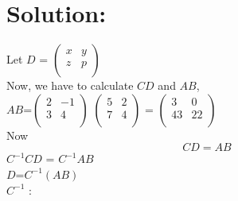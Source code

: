 \documentclass{article}
\begin{document}
\section*{Solution:}
Let $D$ = $\begin{pmatrix}
    x & y\\
    z & p\\
\end{pmatrix}$\\ 
Now, we have to calculate $CD$ and $AB$,\\
$AB$=$\begin{pmatrix}
    2 & -1\\
    3 & 4\\
\end{pmatrix}$ $\begin{pmatrix}
    5 & 2\\
    7 & 4\\
\end{pmatrix}$ = $\begin{pmatrix}
    3 & 0\\
    43 & 22\\
\end{pmatrix}$\\
Now\\
\begin{equation}
    CD=AB
\end{equation}
  $C^{-1}CD$ = $C^{-1}AB$ \\
$D$=$C^{-1}(AB)$\\
\newpage
$C^{-1}$ : \\
\end{document}
